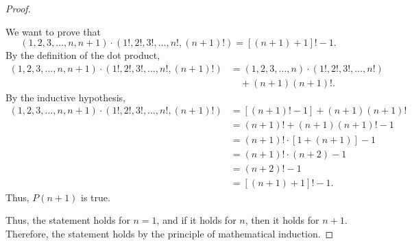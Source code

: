 \begin{proof}
{    \begin{panel}{
        We want to prove that %
        \[
            (1, 2, 3, \dotsc, n, n + 1) \cdot
            (1!, 2!, 3!, \dotsc, n!, (n + 1)!) = [(n + 1) + 1]! - 1.
        \]
        By the definition of the dot product, %
        \begin{align*}
            (1, 2, 3, \dotsc, n, n + 1) \cdot
            (1!, 2!, 3!, \dotsc, n!, (n + 1)!)
                &= (1, 2, 3, \dotsc, n) \cdot (1!, 2!, 3!, \dotsc, n!)\\
                &\quad + (n + 1)(n + 1)!.
        \end{align*}
        By the inductive hypothesis, %
        \begin{align*}
            (1, 2, 3, \dotsc, n, n + 1) \cdot
            (1!, 2!, 3!, \dotsc, n!, (n + 1)!)
                &= [(n + 1)! - 1] + (n + 1)(n + 1)!\\
                &= (n + 1)! + (n + 1)(n + 1)! - 1\\
                &= (n + 1)! \cdot [1 + (n + 1)] - 1\\
                &= (n + 1)! \cdot (n + 2) - 1\\
                &= (n + 2)! - 1\\
                &= [(n + 1) + 1]! - 1.
        \end{align*}
        Thus, $P(n + 1)$ is true.
    }
    \end{panel}

    Thus, the statement holds for $n = 1$, %
    and if it holds for $n$, then it holds for $n + 1$. %
    Therefore, the statement holds by the principle of mathematical induction.
}
\end{proof}